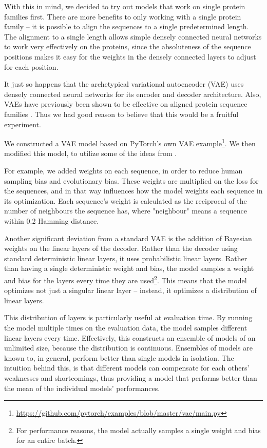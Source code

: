 With this in mind, we decided to try out models that work on single protein families first. There are more benefits to only working with a single protein family -- it is possible to align the sequences to a single predetermined length. The alignment to a single length allows simple densely connected neural networks to work very effectively on the proteins, since the absoluteness of the sequence positions makes it easy for the weights in the densely connected layers to adjust for each position.

It just so happens that the archetypical variational autoencoder (VAE) uses densely connected neural networks for its encoder and decoder architecture. Also, VAEs have previously been shown to be effective on aligned protein sequence families \cite{riesselman2018deep}. Thus we had good reason to believe that this would be a fruitful experiment.

We constructed a VAE model based on PyTorch's own VAE example\footnote{\url{https://github.com/pytorch/examples/blob/master/vae/main.py}}. We then modified this model, to utilize some of the ideas from \cite{riesselman2018deep}.

For example, we added weights on each sequence, in order to reduce human sampling bias and evolutionary bias. These weights are multiplied on the loss for the sequences, and in that way influences how the model weights each sequence in its optimization. Each sequence's weight is calculated as the reciprocal of the number of neighbours the sequence has, where "neighbour" means a sequence within 0.2 Hamming distance.

Another significant deviation from a standard VAE is the addition of Bayesian weights on the linear layers of the decoder. Rather than the decoder using standard deterministic linear layers, it uses probabilistic linear layers. Rather than having a single deterministic weight and bias, the model samples a weight and bias for the layers every time they are used\footnote{For performance reasons, the model actually samples a single weight and bias for an entire batch.}. This means that the model optimizes not just a singular linear layer -- instead, it optimizes a distribution of linear layers.

This distribution of layers is particularly useful at evaluation time. By running the model multiple times on the evaluation data, the model samples different linear layers every time. Effectively, this constructs an ensemble of models of an unlimited size, because the distribution is continuous. Ensembles of models are known to, in general, perform better than single models in isolation. The intuition behind this, is that different models can compensate for each others' weaknesses and shortcomings, thus providing a model that performs better than the mean of the individual models' performances.

